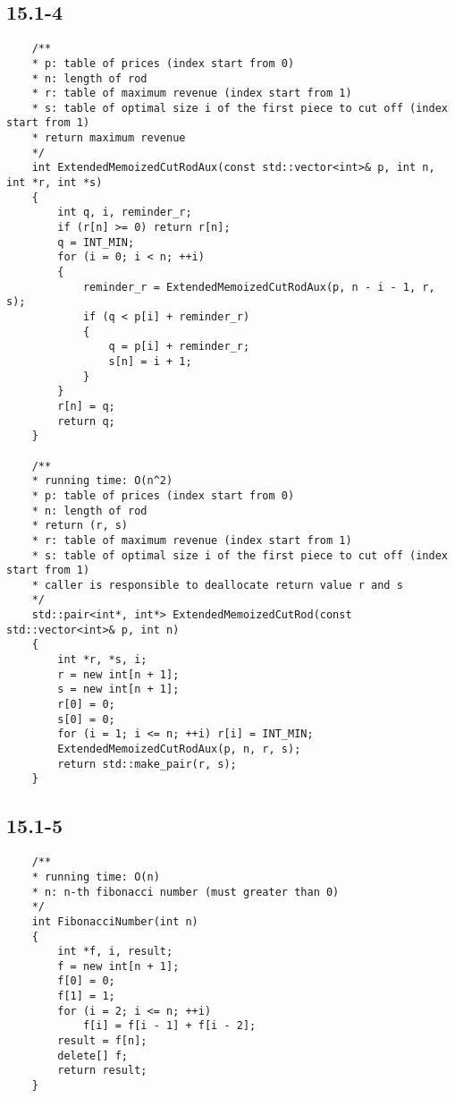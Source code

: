 \subsection*{15.1-4}

\begin{verbatim}
    /**
    * p: table of prices (index start from 0)
    * n: length of rod
    * r: table of maximum revenue (index start from 1)
    * s: table of optimal size i of the first piece to cut off (index start from 1)
    * return maximum revenue
    */
    int ExtendedMemoizedCutRodAux(const std::vector<int>& p, int n, int *r, int *s)
    {
        int q, i, reminder_r;
        if (r[n] >= 0) return r[n];
        q = INT_MIN;
        for (i = 0; i < n; ++i)
        {
            reminder_r = ExtendedMemoizedCutRodAux(p, n - i - 1, r, s);
            if (q < p[i] + reminder_r)
            {
                q = p[i] + reminder_r;
                s[n] = i + 1;
            }
        }
        r[n] = q;
        return q;
    }

    /**
    * running time: O(n^2)
    * p: table of prices (index start from 0)
    * n: length of rod
    * return (r, s)
    * r: table of maximum revenue (index start from 1)
    * s: table of optimal size i of the first piece to cut off (index start from 1)
    * caller is responsible to deallocate return value r and s
    */
    std::pair<int*, int*> ExtendedMemoizedCutRod(const std::vector<int>& p, int n)
    {
        int *r, *s, i;
        r = new int[n + 1];
        s = new int[n + 1];
        r[0] = 0;
        s[0] = 0;
        for (i = 1; i <= n; ++i) r[i] = INT_MIN;
        ExtendedMemoizedCutRodAux(p, n, r, s);
        return std::make_pair(r, s);
    }
\end{verbatim}

\subsection*{15.1-5}

\begin{verbatim}
    /**
    * running time: O(n)
    * n: n-th fibonacci number (must greater than 0)
    */
    int FibonacciNumber(int n)
    {
        int *f, i, result;
        f = new int[n + 1];
        f[0] = 0;
        f[1] = 1;
        for (i = 2; i <= n; ++i)
            f[i] = f[i - 1] + f[i - 2];
        result = f[n];
        delete[] f;
        return result;
    }
\end{verbatim}

